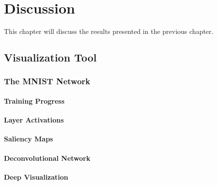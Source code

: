 
\chapter{Discussion}

This chapter will discuss the results presented in the previous chapter.

\section{Visualization Tool}


\subsection{The MNIST Network}


\subsubsection{Training Progress}

\subsubsection{Layer Activations}

\begin{comment}
FIG. 1.5:
- We see that the first convolutional layer do not find any specific features
- It is not until the second convolutional layer that we see features in terms of edges.
- Fc 3: the network is 100\% certain that it is class 0.

FIG. 1.6:
- Shows conv2 at 0, 5 and 10. Should have 1 as well.
\end{comment}

\subsubsection{Saliency Maps}

\subsubsection{Deconvolutional Network}

\subsubsection{Deep Visualization}


